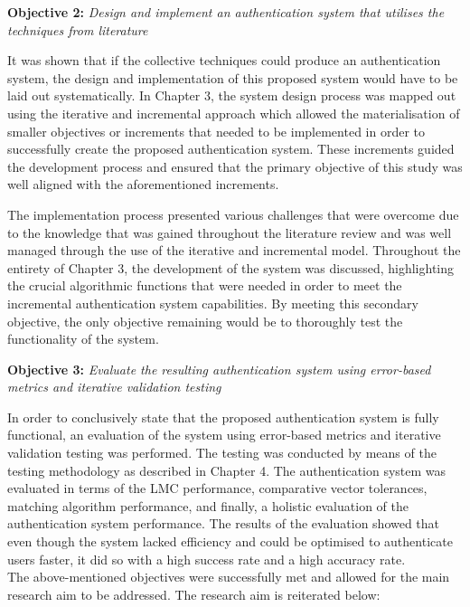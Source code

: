 \textbf{Objective 2:} \textit{Design and implement an authentication system that utilises the techniques from literature}

It was shown that if the collective techniques could produce an authentication system, the design and implementation of this proposed system would have to be laid out systematically. In Chapter 3, the system design process was mapped out using the iterative and incremental approach which allowed the materialisation of smaller objectives or increments that needed to be implemented in order to successfully create the proposed authentication system. These increments guided the development process and ensured that the primary objective of this study was well aligned with the aforementioned increments. 

The implementation process presented various challenges that were overcome due to the knowledge that was gained throughout the literature review and was well managed through the use of the iterative and incremental model. Throughout the entirety of Chapter 3, the development of the system was discussed, highlighting the crucial algorithmic functions that were needed in order to meet the incremental authentication system capabilities. By meeting this secondary objective, the only objective remaining would be to thoroughly test the functionality of the system.\pagebreak


\textbf{Objective 3:} \textit{Evaluate the resulting authentication system using error-based metrics and iterative validation testing}

In order to conclusively state that the proposed authentication system is fully functional, an evaluation of the system using error-based metrics and iterative validation testing was performed. The testing was conducted by means of the testing methodology as described in Chapter 4. The authentication system was evaluated in terms of the LMC performance, comparative vector tolerances, matching algorithm performance, and finally, a holistic evaluation of the authentication system performance.
The results of the evaluation showed that even though the system lacked efficiency and could be optimised to authenticate users faster, it did so with a high success rate and a high accuracy rate.\\

The above-mentioned objectives were successfully met and allowed for the main research aim to be addressed. The research aim is reiterated below:\\

